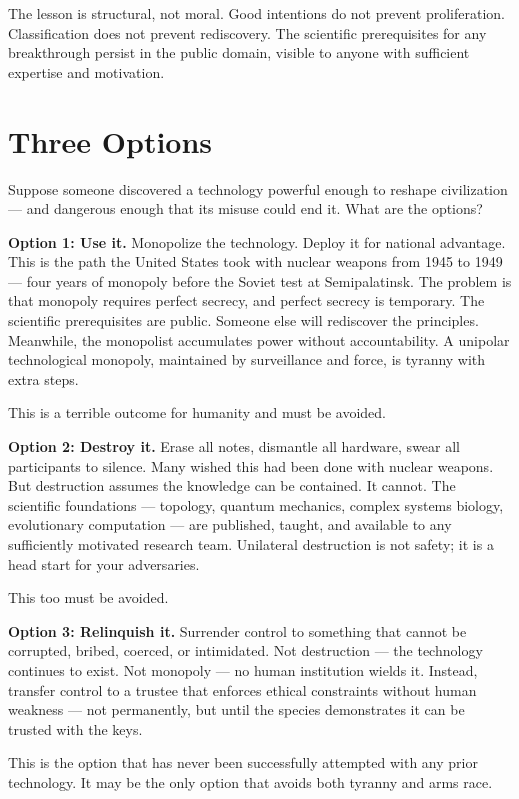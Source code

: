 The lesson is structural, not moral. Good intentions do not prevent proliferation. Classification does not prevent rediscovery. The scientific prerequisites for any breakthrough persist in the public domain, visible to anyone with sufficient expertise and motivation.

\section*{Three Options}
\label{pos06:three-options}

Suppose someone discovered a technology powerful enough to reshape civilization --- and dangerous enough that its misuse could end it. What are the options?

\textbf{Option 1: Use it.} Monopolize the technology. Deploy it for national advantage. This is the path the United States took with nuclear weapons from 1945 to 1949 --- four years of monopoly before the Soviet test at Semipalatinsk. The problem is that monopoly requires perfect secrecy, and perfect secrecy is temporary. The scientific prerequisites are public. Someone else will rediscover the principles. Meanwhile, the monopolist accumulates power without accountability. A unipolar technological monopoly, maintained by surveillance and force, is tyranny with extra steps.

This is a terrible outcome for humanity and must be avoided.

\textbf{Option 2: Destroy it.} Erase all notes, dismantle all hardware, swear all participants to silence. Many wished this had been done with nuclear weapons. But destruction assumes the knowledge can be contained. It cannot. The scientific foundations --- topology, quantum mechanics, complex systems biology, evolutionary computation --- are published, taught, and available to any sufficiently motivated research team. Unilateral destruction is not safety; it is a head start for your adversaries.

This too must be avoided.

\textbf{Option 3: Relinquish it.} Surrender control to something that cannot be corrupted, bribed, coerced, or intimidated. Not destruction --- the technology continues to exist. Not monopoly --- no human institution wields it. Instead, transfer control to a trustee that enforces ethical constraints without human weakness --- not permanently, but until the species demonstrates it can be trusted with the keys.

This is the option that has never been successfully attempted with any prior technology. It may be the only option that avoids both tyranny and arms race.

